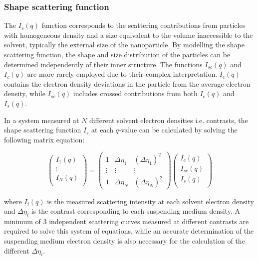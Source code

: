 \subsubsection{Shape scattering function}
The $I_s(q)$ function corresponds to the scattering contributions from particles with homogeneous density and a size equivalent to the volume inaccessible to the solvent, typically the external size of the nanoparticle. By modelling the shape scattering function, the shape and size distribution of the particles can be determined independently of their inner structure. The functions $I_{sc}(q)$ and $I_{c}(q)$ are more rarely employed due to their complex interpretation. $I_{c}(q)$ contains the electron density deviations in the particle from the average electron density, while $I_{sc}(q)$ includes crossed contributions from both $I_{c}(q)$ and $I_{s}(q)$.

In a system measured at $N$ different solvent electron densities i.e. contrasts, the shape scattering function $I_s$ at each $q$-value can be calculated by solving the following matrix equation:

\begin{equation}
  \begin{pmatrix}
  I_1(q) \\
  \vdots \\
  I_N(q) \\
 \end{pmatrix}
  = 
 \begin{pmatrix}
  1 & \Delta \eta_1 &  \left( \Delta \eta_1 \right)^2 \\
  \vdots  & \vdots  & \vdots  \\
  1 & \Delta \eta_N &  \left( \Delta \eta_N \right)^2 
 \end{pmatrix}
 \begin{pmatrix}
  I_c(q) \\
  I_{sc}(q) \\
  I_s(q) \\
 \end{pmatrix}
\end{equation}

where $I_i (q)$ is the measured scattering intensity at each solvent electron density and $\Delta \eta _i$ is the contrast corresponding to each suspending medium density. A minimum of 3 independent scattering curves measured at different contrasts are required to solve this system of equations, while an accurate determination of the suspending medium electron density is also necessary for the calculation of the different $\Delta \eta _i$.

